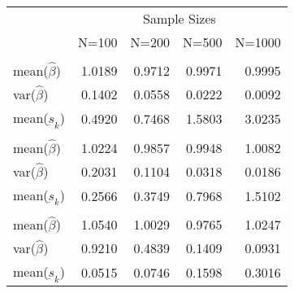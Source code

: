 
\begin{tabular}{lrrrr}
\toprule
\multicolumn{1}{c}{ } & \multicolumn{4}{c}{Sample Sizes} \\
\cmidrule(l{3pt}r{3pt}){2-5}
  & N=100 & N=200 & N=500 & N=1000\\
\midrule
\addlinespace[0.3em]
\multicolumn{5}{l}{\textbf{$ \rho = 0 $  }}\\
\hspace{1em}mean($\hat{\beta}$) & 1.0189 & 0.9712 & 0.9971 & 0.9995\\
\hspace{1em}var($\hat{\beta}$) & 0.1402 & 0.0558 & 0.0222 & 0.0092\\
\hspace{1em}mean($\underbar{s}_k$) & 0.4920 & 0.7468 & 1.5803 & 3.0235\\
\addlinespace[0.3em]
\multicolumn{5}{l}{\textbf{$ \rho = 0.5 $}}\\
\hspace{1em}mean($\hat{\beta}$) & 1.0224 & 0.9857 & 0.9948 & 1.0082\\
\hspace{1em}var($\hat{\beta}$) & 0.2031 & 0.1104 & 0.0318 & 0.0186\\
\hspace{1em}mean($\underbar{s}_k$) & 0.2566 & 0.3749 & 0.7968 & 1.5102\\
\addlinespace[0.3em]
\multicolumn{5}{l}{\textbf{$ \rho = 0.9 $}}\\
\hspace{1em}mean($\hat{\beta}$) & 1.0540 & 1.0029 & 0.9765 & 1.0247\\
\hspace{1em}var($\hat{\beta}$) & 0.9210 & 0.4839 & 0.1409 & 0.0931\\
\hspace{1em}mean($\underbar{s}_k$) & 0.0515 & 0.0746 & 0.1598 & 0.3016\\
\bottomrule
\end{tabular}
